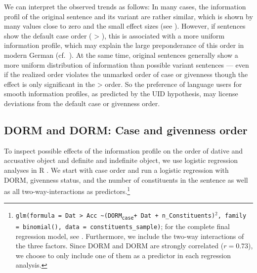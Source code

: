 \documentclass[output=paper,colorlinks,citecolor=brown]{langscibook}
\begin{document}
We can interpret the observed trends as follows: In many cases, the information profil of the original sentence and its variant are rather similar, which is shown by many values close to zero and the small effect sizes (see ). However, if sentences show the default case order (\ReichDat{} > \ReichAcc{}), this is associated with a more uniform information profile, which may explain the large preponderance of this order in modern German (cf.\ ).
At the same time, original sentences generally show a more uniform distribution of information than possible variant sentences --- even if the realized order violates the unmarked order of case or givenness though the effect is only significant in the \ReichDat{} > \ReichAcc{} order. So the preference of language users for smooth information profiles, as predicted by the UID hypothesis, may license deviations from the default case or givenness order.


\subsection{\textnormal{DORM} and \textnormal{DORM}: Case and givenness order}\label{subsec:results_order}

To inspect possible effects of the information profile on the order of dative and accusative object and definite and indefinite object, we use logistic regression analyses in R \citep{R.2023}. We start with case order and run a logistic regression with \textnormal{DORM}, givenness status, and the number of constituents in the sentence as well as all two-way-interactions as predictors.\footnote{\texttt{glm(formula = Dat > Acc \textasciitilde (\textnormal{DORM}\textsubscript{case}\xspace + Dat + n\_Constituents)$^2$, family = binomial(), data = constituents\_sample)}; for the complete final regression model, see . Furthermore, we include the two-way interactions of the three factors. Since \textnormal{DORM} and \textnormal{DORM} are strongly correlated ($r=0.73$), we choose to only include one of them as a predictor in each regression analysis.}
\end{document}
